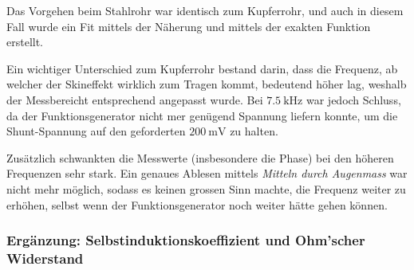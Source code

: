 Das Vorgehen beim  Stahlrohr war identisch zum Kupferrohr, und  auch in diesem
Fall wurde  ein Fit mittels  der N\"aherung  und mittels der  exakten Funktion
erstellt.

Ein   wichtiger   Unterschied  zum   Kupferrohr   bestand   darin,  dass   die
Frequenz,  ab welcher  der  Skineffekt wirklich  zum  Tragen kommt,  bedeutend
h\"oher  lag,  weshalb  der  Messbereicht  entsprechend  angepasst  wurde. Bei
$\SI{7.5}{\kilo\hertz}$ war  jedoch Schluss,  da der  Funktionsgenerator nicht
mer  gen\"ugend  Spannung  liefern  konnte,  um  die  Shunt-Spannung  auf  den
geforderten $\SI{200}{\milli\volt}$ zu halten.

Zus\"atzlich  schwankten  die  Messwerte  (insbesondere  die  Phase)  bei  den
h\"oheren  Frequenzen sehr  stark. Ein genaues  Ablesen mittels  \emph{Mitteln
durch  Augenmass} war  nicht mehr  m\"oglich,  sodass es  keinen grossen  Sinn
machte, die Frequenz  weiter zu erh\"ohen, selbst  wenn der Funktionsgenerator
noch weiter h\"atte gehen k\"onnen.


\begin{figure}[h!]
    \resizebox{\textwidth}{!}{}
\end{figure}
\begin{figure}[h!]
    \resizebox{\textwidth}{!}{}
\end{figure}
\begin{figure}[h!]
    \resizebox{\textwidth}{!}{}
\end{figure}


\clearpage
\subsubsection{Erg\"anzung: Selbstinduktionskoeffizient und Ohm'scher Widerstand}
\label{sec:ausw:subsec:hohlz:st:subsubsec:LR}

\begin{figure}[h!]
    \resizebox{\textwidth}{!}{}
\end{figure}
\begin{figure}[h!]
    \resizebox{\textwidth}{!}{}
\end{figure}
\begin{figure}[h!]
    \resizebox{\textwidth}{!}{}
\end{figure}
